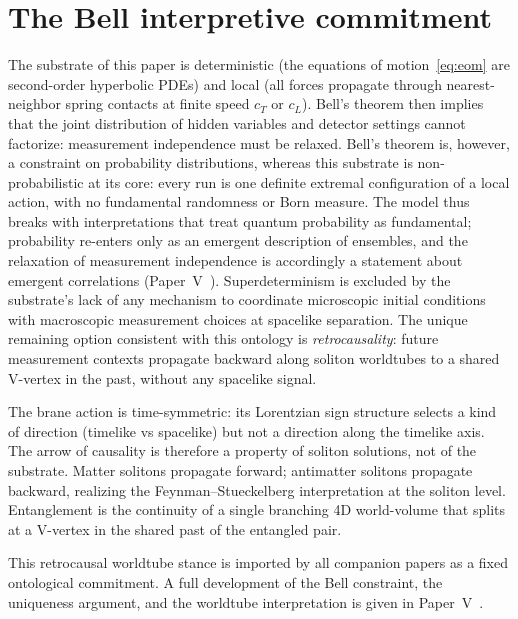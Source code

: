 \section{The Bell interpretive commitment}
\label{sec:bell-interpretation}

The substrate of this paper is deterministic (the equations of motion~\eqref{eq:eom} are second-order
hyperbolic PDEs) and local (all forces propagate through nearest-neighbor spring contacts at finite
speed $c_T$ or $c_L$).
Bell's theorem then implies that the joint distribution of hidden variables and detector settings
cannot factorize: measurement independence must be relaxed.
Bell's theorem is, however, a constraint on probability distributions, whereas this substrate is
non-probabilistic at its core: every run is one definite extremal configuration of a local action,
with no fundamental randomness or Born measure.
The model thus breaks with interpretations that treat quantum probability as fundamental;
probability re-enters only as an emergent description of ensembles, and the relaxation of
measurement independence is accordingly a statement about emergent correlations
(Paper~V~\citep{MolzbergerBell2026}).
Superdeterminism is excluded by the substrate's lack of any mechanism to coordinate microscopic
initial conditions with macroscopic measurement choices at spacelike separation.
The unique remaining option consistent with this ontology is \emph{retrocausality}: future measurement
contexts propagate backward along soliton worldtubes to a shared V-vertex in the past, without any
spacelike signal.

The brane action is time-symmetric: its Lorentzian sign structure selects a kind of direction
(timelike vs spacelike) but not a direction along the timelike axis.
The arrow of causality is therefore a property of soliton solutions, not of the substrate.
Matter solitons propagate forward; antimatter solitons propagate backward, realizing the
Feynman--Stueckelberg interpretation at the soliton level.
Entanglement is the continuity of a single branching 4D world-volume that splits at a V-vertex in
the shared past of the entangled pair.

This retrocausal worldtube stance is imported by all companion papers as a fixed ontological
commitment.
A full development of the Bell constraint, the uniqueness argument, and the worldtube
interpretation is given in Paper~V~\citep{MolzbergerBell2026}.